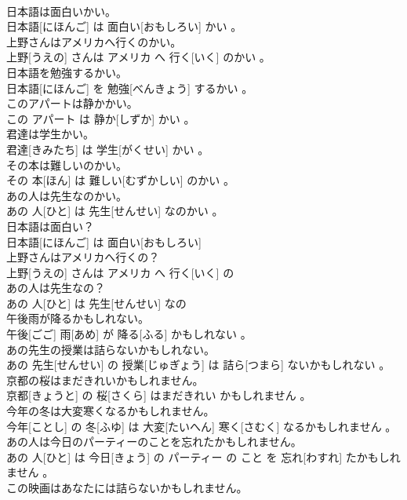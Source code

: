 \documentclass[8pt]{extreport}
\begin{document}
\begin{CJK}{UTF8}{min}
\\	日本語は面白いかい。	
\\	日本語[にほんご] は 面白い[おもしろい] かい 。
\\	上野さんはアメリカへ行くのかい。	
\\	上野[うえの] さんは アメリカ へ 行く[いく] のかい 。
\\	日本語を勉強するかい。	
\\	日本語[にほんご] を 勉強[べんきょう] するかい 。
\\	このアパートは静かかい。	
\\	この アパート は 静か[しずか] かい 。
\\	君達は学生かい。	
\\	君達[きみたち] は 学生[がくせい] かい 。
\\	その本は難しいのかい。	
\\	その 本[ほん] は 難しい[むずかしい] のかい 。
\\	あの人は先生なのかい。	
\\	あの 人[ひと] は 先生[せんせい] なのかい 。
\\	日本語は面白い？	
\\	日本語[にほんご] は 面白い[おもしろい] 
\\	上野さんはアメリカへ行くの？	
\\	上野[うえの] さんは アメリカ へ 行く[いく] の 
\\	あの人は先生なの？	
\\	あの 人[ひと] は 先生[せんせい] なの 
\\	午後雨が降るかもしれない。	
\\	午後[ごご] 雨[あめ] が 降る[ふる] かもしれない 。
\\	あの先生の授業は詰らないかもしれない。	
\\	あの 先生[せんせい] の 授業[じゅぎょう] は 詰ら[つまら] ないかもしれない 。
\\	京都の桜はまだきれいかもしれません。	
\\	京都[きょうと] の 桜[さくら] はまだきれい かもしれません 。
\\	今年の冬は大変寒くなるかもしれません。	
\\	今年[ことし] の 冬[ふゆ] は 大変[たいへん] 寒く[さむく] なるかもしれません 。
\\	あの人は今日のパーティーのことを忘れたかもしれません。	
\\	あの 人[ひと] は 今日[きょう] の パーティー の こと を 忘れ[わすれ] たかもしれません 。
\\	この映画はあなたには詰らないかもしれません。	

\end{CJK}
\end{document}
